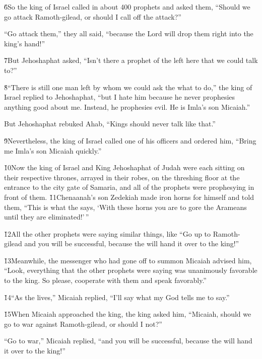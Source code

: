 \v{6}So the king of Israel called in about 400 prophets and asked them, ``Should we go attack Ramoth-gilead, or should I call off the attack?''

``Go attack them,'' they all said, ``because the Lord will drop them right into the king's hand!''

\v{7}But Jehoshaphat asked, ``Isn't there a prophet of the  left here that we could talk to?''

\v{8}``There is still one man left by whom we could ask the  what to do,'' the king of Israel replied to Jehoshaphat, ``but I hate him because he never prophesies anything good about me. Instead, he prophesies evil. He is Imla's son Micaiah.''

But Jehoshaphat rebuked Ahab, ``Kings should never talk like that.''

\v{9}Nevertheless, the king of Israel called one of his officers and ordered him, ``Bring me Imla's son Micaiah quickly.''

\v{10}Now the king of Israel and King Jehoshaphat of Judah were each sitting on their respective thrones, arrayed in their robes, on the threshing floor at the entrance to the city gate of Samaria, and all of the prophets were prophesying in front of them. \v{11}Chenaanah's son Zedekiah made iron horns for himself and told them, ``This is what the  says, `With these horns you are to gore the Arameans until they are eliminated!'\,''

\v{12}All the other prophets were saying similar things, like ``Go up to Ramoth-gilead and you will be successful, because the  will hand it over to the king!''

\v{13}Meanwhile, the messenger who had gone off to summon Micaiah advised him, ``Look, everything that the other prophets were saying was unanimously favorable to the king. So please, cooperate with them and speak favorably.''

\v{14}``As the  lives,'' Micaiah replied, ``I'll say what my God tells me to say.''

\v{15}When Micaiah approached the king, the king asked him, ``Micaiah, should we go to war against Ramoth-gilead, or should I not?''

``Go to war,'' Micaiah replied, ``and you will be successful, because the  will hand it over to the king!''

